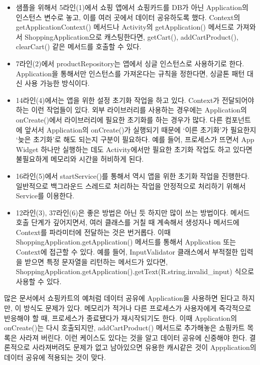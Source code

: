 \begin{itemize}
\item 샘플을 위해서 5라인(1)에서 쇼핑 앱에서 쇼핑카드를 DB가 아닌 Application의 인스턴스 변수로 놓고, 이를 여러 곳에서 데이터 공유하도록 했다.
Context의 getApplicationContext() 메서드나 Activity의 getApplication() 메서드로 가져와서 ShoppingApplication으로 캐스팅한다면, getCart(), addCartProduct(), clearCart() 같은 메서드를 호출할 수 있다.

\item 7라인(2)에서 productRepository는 앱에서 싱글 인스턴스로 사용하기로 한다. Application을 통해서만 인스턴스를 가져온다는 규칙을 정한다면, 싱글톤 패턴 대신 사용 가능한 방식이다.  

\item 14라인(4)에서는 앱을 위한 설정 초기화 작업을 하고 있다. Context가 전달되어야 하는 이런 작업들이 있다. 외부 라이브러리를 사용하는 경우에는 Application의 onCreate()에서 라이브러리에 필요한 초기화를 하는 경우가 많다. 
다른 컴포넌트에 앞서서 Application의 onCreate()가 실행되기 때문에 `이른 초기화'가 필요한지 `늦은 초기화'로 해도 되는지 구분이 필요하다.
예를 들어, 프로세스가 뜨면서 App Widget 하나만 실행하는 데도 Activity에서만 필요한 초기화 작업도 하고 있다면 불필요하게 메모리와 시간을 허비하게 된다.

\item 16라인(5)에서 startService()를 통해서 역시 앱을 위한 초기화 작업을 진행한다. 일반적으로 백그라운드 스레드로 처리하는 작업을 안정적으로 처리하기 위해서 Service를 이용한다.

\item 12라인(3), 37라인(6)은 좋은 방법은 아닌 듯 하지만 많이 쓰는 방법이다. 
메서드 호출 단계가 깊어지면서, 여러 클래스를 거칠 때 계속해서 생성자나 메서드에 Context를 파라미터에 전달하는 것은 번거롭다. 
이때 ShoppingApplication.getApplication() 메서드를 통해서 Application 또는 Context에 접근할 수 있다.
예를 들어, InputValidator 클래스에서 부적절한 입력을 받으면 특정 문자열을 리턴하는 메서드가 있다면,  ShoppingApplication.getApplication().getText(R.string.invalid\_input) 식으로 사용할 수 있다.
\end{itemize}

많은 문서에서 쇼핑카트의 예처럼 데이터 공유에 Application을 사용하면 된다고 하지만, 이 방식도 문제가 있다.
메모리가 적거나 다른 프로세스가 사용자에게 즉각적으로 반응해야 할 때, 프로세스가 종료됐다가 재시작되기도 한다.
이때 Application의 onCreate()는 다시 호출되지만, addCartProduct() 메서드로 추가해놓은 쇼핑카트 목록은 사라져 버린다. 
이런 케이스도 있다는 것을 알고 데이터 공유에 신중해야 한다.
결론적으로 사라져버려도 문제가 없고 남아있으면 유용한 캐시같은 것이 Appplication의 데이터 공유에 적용되는 것이 맞다.

